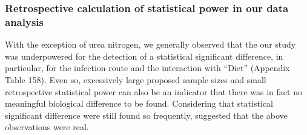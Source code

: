 \documentclass[
  12pt,
  letterpaper,
]{article}
\begin{document}
\subsubsection{Retrospective calculation of statistical power in our data analysis}\label{retrospective-calculation-of-statistical-power-in-our-data-analysis-4}

With the exception of urea nitrogen, we generally observed that the our study was underpowered for the detection of a statistical significant difference, in particular, for the infection route and the interaction with ``Diet'' (Appendix Table 158). Even so, excessively large proposed sample sizes and small retrospective statistical power can also be an indicator that there was in fact no meaningful biological difference to be found. Considering that statistical significant difference were still found so frequently, suggested that the above observations were real.
\end{document}
